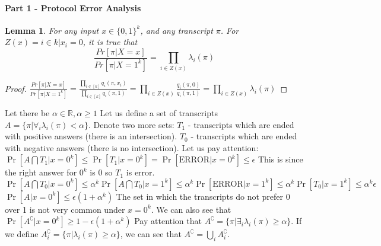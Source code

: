 \documentclass{article}
\theoremstyle{plain}
\newtheorem{lemma}[theorem]{Lemma}
\begin{document}
\paragraph{Part 1 - Protocol Error Analysis}
\begin{lemma}
For any input $x \in \{0,1\}^k$, and any transcript $\pi$. For $Z(x) = {i \in k | x_i = 0}$, it is true that  \newline
\begin{equation*}
    \frac{Pr[\pi | X = x]}{Pr[\pi | X = 1^k]} = \prod_{i \in Z(x)} \lambda_i(\pi)
\end{equation*}
\end{lemma}
\begin{proof}
$\frac{Pr[\pi | X = x]}{Pr[\pi | X = 1^k]} = \frac{\prod_{i \in [k]} q_i (\pi, x_i)}{\prod_{i \in [k]} q_i (\pi, 1)} = \prod_{i \in Z(x)} \frac{q_i (\pi, 0)}{q_i (\pi, 1)} = \prod_{i \in Z(x)} \lambda_i (\pi)$
\end{proof}
Let there be $\alpha \in \mathbb{R}, \alpha \geq 1$ \newline
Let us define a set of transcripts $A = \{\pi | \forall_i \lambda_i (\pi) < \alpha \}$. 
Denote two more sets: $T_1$ - transcripts which are ended with positive answers (there is an intersection). $T_0$ - transcripts which are ended with negative answers (there is no intersection). \newline
Let us pay attention: \newline
$\Pr[A \bigcap T_1 | x = 0^k] \leq \Pr[T_1 | x = 0^k] = \Pr[\text{ERROR} | x = 0^k] \leq \epsilon$ \newline
This is since the right answer for $0^k$ is 0 so $T_1$ is error. \newline 
$\Pr[A \bigcap T_0 | x = 0^k] \leq \alpha ^k \Pr[A \bigcap T_0 | x = 1^k] \leq \alpha ^k \Pr[\text{ERROR} | x = 1^k] \leq \alpha ^k \Pr[T_0| x = 1^k] \leq \alpha ^k \epsilon$ \newline
$\Pr[A| x = 0^k] \leq \epsilon (1 + \alpha ^k) $ \newline
The set in which the transcripts do not prefer 0 over 1 is not very common under $x = 0^k$. \newline
We can also see that $\Pr[A^\complement| x = 0^k] \geq 1 - \epsilon (1 + \alpha ^k) $ \newline
Pay attention that $A^\complement = \{\pi | \exists_i \lambda_i(\pi) \geq \alpha\}$. \newline
If we define $A_{i}^\complement = \{\pi | \lambda_i(\pi) \geq \alpha\}$, we can see that $A^\complement = \bigcup_{i} A_{i}^\complement$.
\end{document}
